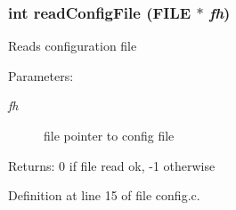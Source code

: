 \subsubsection{\setlength{\rightskip}{0pt plus 5cm}int read\-Config\-File (FILE $\ast$ {\em fh})}\label{config_8h_a0}


Reads configuration file

\begin{Desc}
\item[Parameters:]
\begin{description}
\item[{\em fh}]file pointer to config file \end{description}
\end{Desc}
\begin{Desc}
\item[Returns:]0 if file read ok, -1 otherwise \end{Desc}


Definition at line 15 of file config.c.